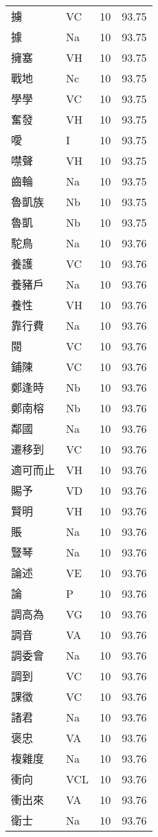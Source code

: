 \documentclass[twocolumn]{book}
\begin{document}
\begin{supertabular}{llrr}
擄 & VC & 10 &  93.75\\
據 & Na & 10 &  93.75\\
擁塞 & VH & 10 &  93.75\\
戰地 & Nc & 10 &  93.75\\
學學 & VC & 10 &  93.75\\
奮發 & VH & 10 &  93.75\\
噯 & I & 10 &  93.75\\
噤聲 & VH & 10 &  93.75\\
齒輪 & Na & 10 &  93.75\\
魯凱族 & Nb & 10 &  93.75\\
魯凱 & Nb & 10 &  93.75\\
駝鳥 & Na & 10 &  93.76\\
養護 & VC & 10 &  93.76\\
養豬戶 & Na & 10 &  93.76\\
養性 & VH & 10 &  93.76\\
靠行費 & Na & 10 &  93.76\\
閱 & VC & 10 &  93.76\\
鋪陳 & VC & 10 &  93.76\\
鄭逢時 & Nb & 10 &  93.76\\
鄭南榕 & Nb & 10 &  93.76\\
鄰國 & Na & 10 &  93.76\\
遷移到 & VC & 10 &  93.76\\
適可而止 & VH & 10 &  93.76\\
賜予 & VD & 10 &  93.76\\
賢明 & VH & 10 &  93.76\\
賬 & Na & 10 &  93.76\\
豎琴 & Na & 10 &  93.76\\
論述 & VE & 10 &  93.76\\
論 & P & 10 &  93.76\\
調高為 & VG & 10 &  93.76\\
調音 & VA & 10 &  93.76\\
調委會 & Na & 10 &  93.76\\
調到 & VC & 10 &  93.76\\
課徵 & VC & 10 &  93.76\\
諸君 & Na & 10 &  93.76\\
褒忠 & VA & 10 &  93.76\\
複雜度 & Na & 10 &  93.76\\
衝向 & VCL & 10 &  93.76\\
衝出來 & VA & 10 &  93.76\\
衛士 & Na & 10 &  93.76\\

\end{supertabular}
\end{document}
